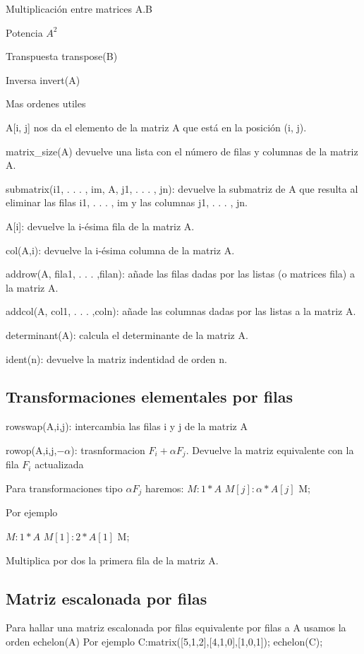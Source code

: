 \documentclass[a4paper, 12pt] {article}
\begin{document}
Multiplicación entre matrices A.B

Potencia $A^2$

Transpuesta transpose(B)

Inversa invert(A)



Mas ordenes utiles

A[i, j] nos da el elemento de la matriz A que está en la posición (i, j).

matrix\_size(A) devuelve una lista con el número de filas y columnas de la matriz A.

submatrix(i1, . . . , im, A, j1, . . . , jn): devuelve la submatriz de A que resulta al eliminar las filas i1, . . . , im y las columnas j1, . . . , jn.

A[i]: devuelve la i-ésima fila de la matriz A.

col(A,i): devuelve la i-ésima columna de la matriz A.

addrow(A, fila1, . . . ,filan): añade las filas dadas por las listas (o matrices fila) a la matriz A.

addcol(A, col1, . . . ,coln): añade las columnas dadas por las listas a la matriz A.

determinant(A): calcula el determinante de la matriz A.

ident(n): devuelve la matriz indentidad de orden n.

\subsection{Transformaciones elementales por filas}
rowswap(A,i,j): intercambia las filas i y j de la matriz A

rowop(A,i,j,$-α$): trasnformacion $F_i + αF_j$. Devuelve la matriz equivalente con la fila $F_i$ actualizada

Para transformaciones tipo $αF_j$ haremos: $M:1*A$ $M[j]:α*A[j]$ M;

Por ejemplo

$M:1*A$ $M[1]:2*A[1]$ M;

Multiplica por dos la primera fila de la matriz A.


\subsection{Matriz escalonada por filas}

Para hallar una matriz escalonada por filas equivalente por filas a A usamos la orden
echelon(A)
Por ejemplo
C:matrix([5,1,2],[4,1,0],[1,0,1]);
echelon(C);
\end{document}
